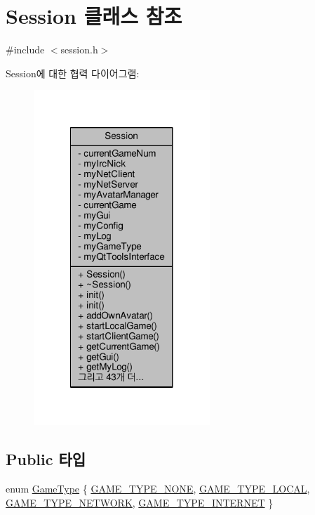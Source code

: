\hypertarget{class_session}{\section{Session 클래스 참조}
\label{class_session}
}


{\ttfamily \#include $<$session.\-h$>$}



Session에 대한 협력 다이어그램\-:
\nopagebreak
\begin{figure}[H]
\begin{center}
\leavevmode
\includegraphics[width=188pt]{class_session__coll__graph}
\end{center}
\end{figure}
\subsection*{Public 타입}
\begin{DoxyCompactItemize}
\item 
enum \hyperlink{class_session_a6989c72d21ad19fd7abbd1c8d95d78c1}{Game\-Type} \{ \hyperlink{class_session_a6989c72d21ad19fd7abbd1c8d95d78c1a9714cf47eacb5ff229c807e48ea68319}{G\-A\-M\-E\-\_\-\-T\-Y\-P\-E\-\_\-\-N\-O\-N\-E}, 
\hyperlink{class_session_a6989c72d21ad19fd7abbd1c8d95d78c1a347a5eef5f0bd9a982bec2ff54a201e7}{G\-A\-M\-E\-\_\-\-T\-Y\-P\-E\-\_\-\-L\-O\-C\-A\-L}, 
\hyperlink{class_session_a6989c72d21ad19fd7abbd1c8d95d78c1a878b602bad23ad76103fb270b21c3a80}{G\-A\-M\-E\-\_\-\-T\-Y\-P\-E\-\_\-\-N\-E\-T\-W\-O\-R\-K}, 
\hyperlink{class_session_a6989c72d21ad19fd7abbd1c8d95d78c1adb35dec5c0038852cb94ffbd5c5739f2}{G\-A\-M\-E\-\_\-\-T\-Y\-P\-E\-\_\-\-I\-N\-T\-E\-R\-N\-E\-T}
 \}
\end{DoxyCompactItemize}
